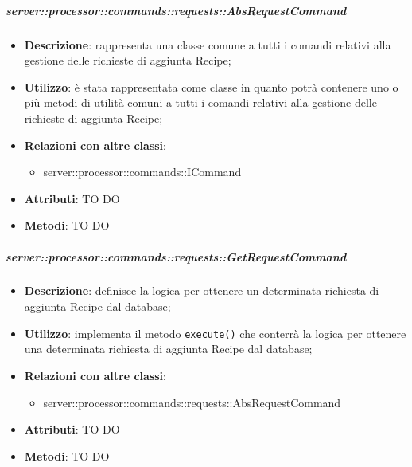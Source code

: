         \subparagraph{server::processor::commands::requests::AbsRequestCommand} %
        \label{subp:bdsm_app_server_processor_commands_requests_absrequestcommand}
        \begin{itemize}
          \item \textbf{Descrizione}: rappresenta una classe comune a tutti i comandi relativi alla gestione delle richieste di aggiunta Recipe;
          \item \textbf{Utilizzo}: è stata rappresentata come classe in quanto potrà contenere uno o più metodi di utilità comuni a tutti i comandi relativi alla gestione delle richieste di aggiunta Recipe;
          \item \textbf{Relazioni con altre classi}:
            \begin{itemize}
              \item server::processor::commands::ICommand
            \end{itemize}
			\item \textbf{Attributi}: TO DO
			\item \textbf{Metodi}: TO DO
        \end{itemize}

        \subparagraph{server::processor::commands::requests::GetRequestCommand} %
        \label{subp:bdsm_app_server_processor_commands_requests_getrequestcommand}
        \begin{itemize}
          \item \textbf{Descrizione}: definisce la logica per ottenere un determinata richiesta di aggiunta Recipe dal database;
          \item \textbf{Utilizzo}: implementa il metodo \texttt{execute()} che conterrà la logica per ottenere una determinata richiesta di aggiunta Recipe dal database;
          \item \textbf{Relazioni con altre classi}:
            \begin{itemize}
              \item server::processor::commands::requests::AbsRequestCommand
            \end{itemize}
			\item \textbf{Attributi}: TO DO
			\item \textbf{Metodi}: TO DO
        \end{itemize}

